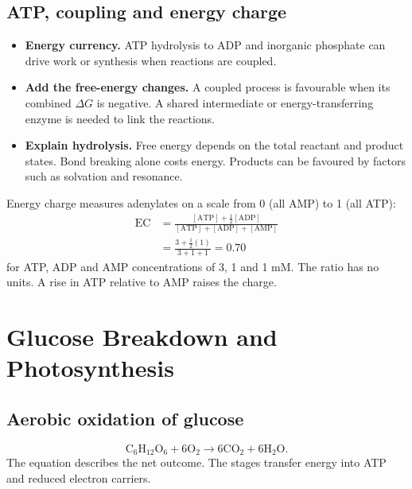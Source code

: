 \documentclass[12pt,a4paper]{article}
\begin{document}
\subsection{ATP, coupling and energy charge}
\begin{itemize}[leftmargin=*, itemsep=3pt, topsep=4pt]
  \item \textbf{Energy currency.} ATP hydrolysis to ADP and inorganic phosphate can drive work or synthesis when reactions are coupled.
  \item \textbf{Add the free-energy changes.} A coupled process is favourable when its combined $\Delta G$ is negative. A shared intermediate or energy-transferring enzyme is needed to link the reactions.
  \item \textbf{Explain hydrolysis.} Free energy depends on the total reactant and product states. Bond breaking alone costs energy. Products can be favoured by factors such as solvation and resonance.
\end{itemize}
\begin{tcolorbox}[examplebox, title={Energy charge of an adenylate pool}]
Energy charge measures adenylates on a scale from 0 (all AMP) to 1 (all ATP):
\[
\begin{aligned}
\mathrm{EC}
 &=\frac{[\mathrm{ATP}]+\frac12[\mathrm{ADP}]}{[\mathrm{ATP}]+[\mathrm{ADP}]+[\mathrm{AMP}]}\\
 &=\frac{3+\frac12(1)}{3+1+1}=0.70
\end{aligned}
\]
for ATP, ADP and AMP concentrations of 3, 1 and 1 mM. The ratio has no units. A rise in ATP relative to AMP raises the charge.
\end{tcolorbox}

\section{Glucose Breakdown and Photosynthesis}
\subsection{Aerobic oxidation of glucose}
\begin{tcolorbox}[formulabox, title={Overall carbon and oxygen balance}]
\[
\mathrm{C_6H_{12}O_6+6O_2\to6CO_2+6H_2O}.
\]
The equation describes the net outcome. The stages transfer energy into ATP and reduced electron carriers.
\end{tcolorbox}
\end{document}
